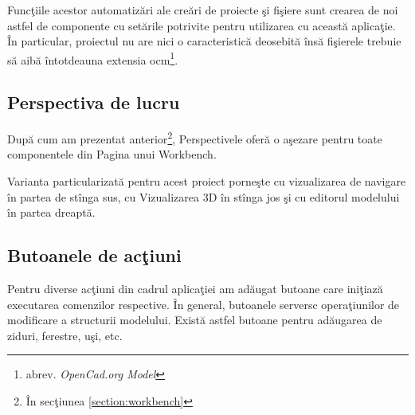 Funcţiile acestor automatizări ale creări de proiecte şi fişiere sunt crearea 
de noi astfel de componente cu setările potrivite pentru utilizarea cu această 
aplicaţie. În particular, proiectul nu are nici o caracteristică deosebită însă 
fişierele trebuie să aibă întotdeauna extensia ocm\footnote{abrev. 
\textit{OpenCad.org Model}}.

\subsection{Perspectiva de lucru}

După cum am prezentat anterior\footnote{În secţiunea \ref{section:workbench}},
Perspectivele oferă o aşezare pentru toate componentele din Pagina unui
Workbench.

Varianta particularizată pentru acest proiect porneşte cu vizualizarea de
navigare în partea de stînga sus, cu Vizualizarea 3D în stînga jos şi cu
editorul modelului în partea dreaptă.

\subsection{Butoanele de acţiuni}

Pentru diverse acţiuni din cadrul aplicaţiei am adăugat butoane care iniţiază
executarea comenzilor respective. În general, butoanele serversc operaţiunilor
de modificare a structurii modelului. Există astfel butoane pentru adăugarea de
ziduri, ferestre, uşi, etc.
